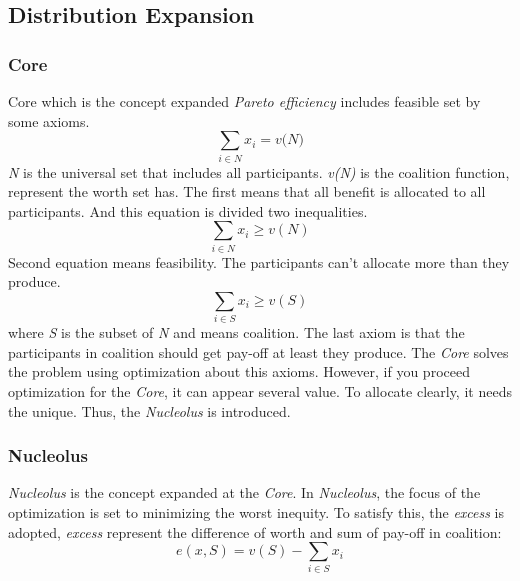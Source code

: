 \documentclass[journal]{IEEEtran} %
\begin{document}
\subsection{Distribution Expansion}













\newpage
\subsubsection{Core}
Core which is the concept expanded \textit{Pareto efficiency} includes feasible set by some axioms. 
\begin{equation}
\sum\limits_{i\in{N}} x_{i} = \textit{v(N)}
\end{equation}
\textit{N} is the universal set that includes all participants. \textit{v(N)} is the coalition function, represent the worth set has. The first means that all benefit is allocated to all participants. And this equation is divided two inequalities.
\begin{equation}
\sum\limits_{i\in{N}} x_{i} \geq v(N)
\end{equation}
Second equation means feasibility. The participants can't allocate more than they produce.
\begin{equation}
\sum\limits_{i\in{S}} x_{i} \geq v(S)
\end{equation}
where \textit{S} is the subset of \textit{N} and means coalition. The last axiom is that the participants in coalition should get pay-off at least they produce.
The \textit{Core} solves the problem using optimization about this axioms. However, if you proceed optimization for the \textit{Core}, it can  appear several value. To allocate clearly, it needs the unique. Thus, the \textit{Nucleolus} is introduced.

\subsubsection{Nucleolus}
\textit{Nucleolus} is the concept expanded at the \textit{Core}. In \textit{Nucleolus}, the focus of the optimization is set to minimizing the worst inequity. To satisfy this, the \textit{excess} is adopted, \textit{excess} represent the difference of worth and sum of pay-off in coalition:
\begin{equation}
e(x,S) = v(S) - \sum\limits_{i\in{S}} x_i
\end{equation}
\end{document}

